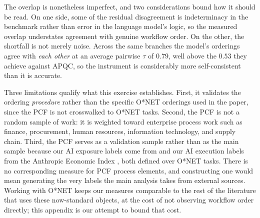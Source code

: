 The overlap is nonetheless imperfect, and two considerations bound how it should be read.
On one side, some of the residual disagreement is indeterminacy in the benchmark rather than error in the
language model's logic, so the measured overlap understates agreement with genuine workflow order.
On the other, the shortfall is not merely noise.
Across the same branches the model's orderings agree with \emph{each other} at an average pairwise $\tau$ of
$0.79$, well above the $0.53$ they achieve against APQC, so the instrument is considerably more
self-consistent than it is accurate.

Three limitations qualify what this exercise establishes.
First, it validates the ordering \emph{procedure} rather than the specific O*NET orderings used in the paper,
since the PCF is not crosswalked to O*NET tasks.
Second, the PCF is not a random sample of work: it is weighted toward enterprise process work such as finance,
procurement, human resources, information technology, and supply chain.
Third, the PCF serves as a validation sample rather than as the main sample because our AI exposure labels
come from \citet{eloundou2023gpts} and our AI execution labels from the Anthropic Economic Index
\citep{handa2025economictasksperformedai}, both defined over O*NET tasks.
There is no corresponding measure for PCF process elements, and constructing one would mean generating the
very labels the main analysis takes from external sources.
Working with O*NET keeps our measures comparable to the rest of the literature that uses these now-standard
objects, at the cost of not observing workflow order directly; this appendix is our attempt to bound that
cost.
